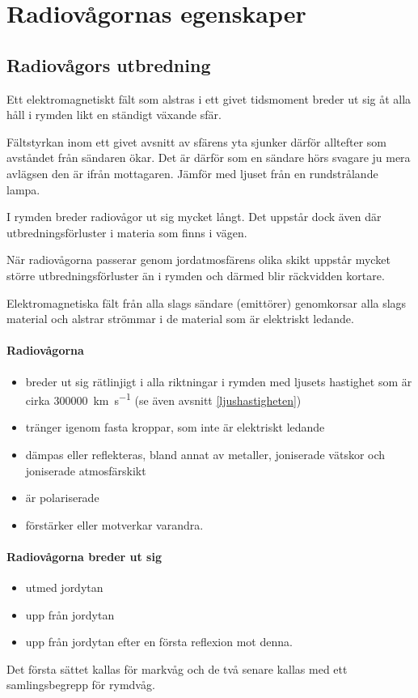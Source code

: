 \section{Radiovågornas egenskaper}
\label{radiovågornasegenskaper}

\subsection{Radiovågors utbredning}

Ett elektromagnetiskt fält som alstras i ett givet tidsmoment breder
ut sig åt alla håll i rymden likt en ständigt växande sfär.

Fältstyrkan inom ett givet avsnitt av sfärens yta sjunker därför
alltefter som avståndet från sändaren ökar.
Det är därför som en sändare hörs svagare ju mera avlägsen den är ifrån
mottagaren.
Jämför med ljuset från en rundstrålande lampa.

I rymden breder radiovågor ut sig mycket långt. Det uppstår dock även
där utbredningsförluster i materia som finns i vägen.

När radiovågorna passerar genom jordatmosfärens olika skikt uppstår mycket
större utbredningsförluster än i rymden och därmed blir räckvidden kortare.

Elektromagnetiska fält från alla slags sändare (emittörer) genomkorsar alla
slags material och alstrar strömmar i de material som är elektriskt ledande.

\paragraph{Radiovågorna}
\begin{itemize}
  \item breder ut sig rätlinjigt i alla riktningar i rymden med ljusets
  hastighet som är cirka \SI{300000}{\kilo\metre\per\second} (se även avsnitt
  \ref{ljushastigheten})
  \item tränger igenom fasta kroppar, som inte är elektriskt ledande
  \item dämpas eller reflekteras, bland annat av metaller, joniserade vätskor
  och joniserade atmosfärskikt
  \item är polariserade
  \item förstärker eller motverkar varandra.
\end{itemize}

\paragraph{Radiovågorna breder ut sig}
\begin{itemize}
  \item utmed jordytan
  \item upp från jordytan
  \item upp från jordytan efter en första reflexion mot denna.
\end{itemize}
Det första sättet kallas för markvåg och de två senare kallas med ett
samlingsbegrepp för rymdvåg.

